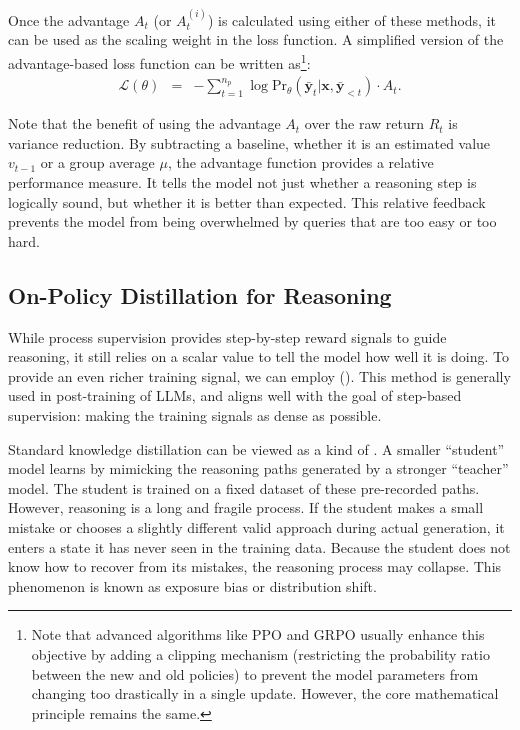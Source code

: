 Once the advantage $A_t$ (or $A_t^{(i)}$) is calculated using either of these methods, it can be used as the scaling weight in the loss function. A simplified version of the advantage-based loss function can be written as\footnote{Note that advanced algorithms like PPO and GRPO usually enhance this objective by adding a clipping mechanism (restricting the probability ratio between the new and old policies) to prevent the model parameters from changing too drastically in a single update. However, the core mathematical principle remains the same.}:
\begin{eqnarray}
\mathcal{L}(\theta) & = & - \sum_{t=1}^{n_p} \log \mathrm{Pr}_{\theta}(\bar{\mathbf{y}}_t | \mathbf{x}, \bar{\mathbf{y}}_{<t}) \cdot A_t.
\end{eqnarray}

Note that the benefit of using the advantage $A_t$ over the raw return $R_t$ is variance reduction. By subtracting a baseline, whether it is an estimated value $v_{t-1}$ or a group average $\mu$, the advantage function provides a relative performance measure. It tells the model not just whether a reasoning step is logically sound, but whether it is better than expected. This relative feedback prevents the model from being overwhelmed by queries that are too easy or too hard.

\subsection{On-Policy Distillation for Reasoning}

While process supervision provides step-by-step reward signals to guide reasoning, it still relies on a scalar value to tell the model how well it is doing. To provide an even richer training signal, we can employ  (). This method is generally used in post-training of LLMs, and aligns well with the goal of step-based supervision: making the training signals as dense as possible.

Standard knowledge distillation can be viewed as a kind of . A smaller ``student'' model learns by mimicking the reasoning paths generated by a stronger ``teacher'' model. The student is trained on a fixed dataset of these pre-recorded paths. However, reasoning is a long and fragile process. If the student makes a small mistake or chooses a slightly different valid approach during actual generation, it enters a state it has never seen in the training data. Because the student does not know how to recover from its mistakes, the reasoning process may collapse. This phenomenon is known as exposure bias or distribution shift.

